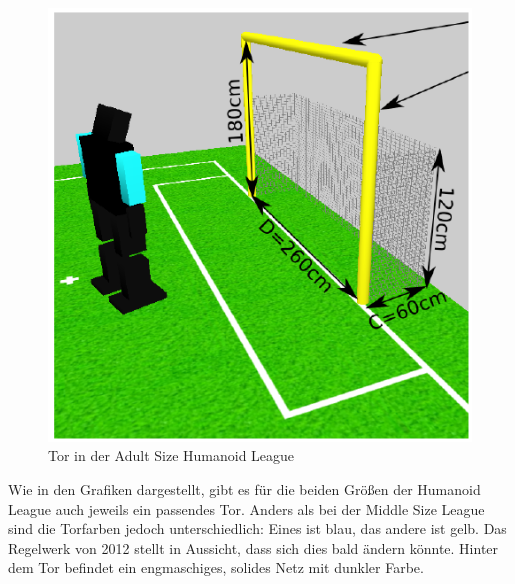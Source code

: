 \documentclass[a4paper,12pt]{article}
\begin{document}
\begin{figure}[H]
    \includegraphics{humanoid-adultsize-goal.png}
    \caption{Tor in der Adult Size Humanoid League}
    \label{fig:goal-human-adult}
\end{figure}
Wie in den Grafiken dargestellt, gibt es für die beiden Größen der Humanoid League auch jeweils ein
passendes Tor. Anders als bei der Middle Size League sind die Torfarben jedoch unterschiedlich:
Eines ist blau, das andere ist gelb. Das Regelwerk von 2012 stellt in Aussicht, dass sich dies bald
ändern könnte. Hinter dem Tor befindet ein engmaschiges, solides Netz mit dunkler Farbe.
\end{document}
